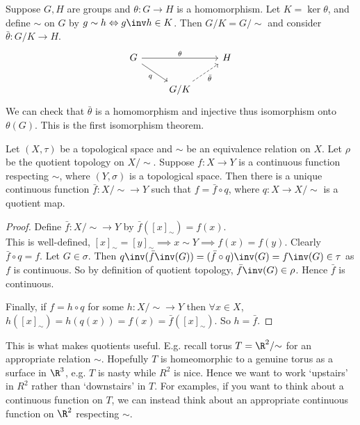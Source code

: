 \begin{example}
Suppose $G,H$ are groups and $\theta: G\to H$ is a homomorphism. Let $K = \ker\theta$, and define $\sim$ on $G$ by $g\sim h\Leftrightarrow g\inv h\in K$. Then $G/K = G/ {\sim}$ and consider $\bar{\theta}: G/K\to H$.
\[\begin{tikzcd}
	G & {} & H \\
	& {G / K}
	\arrow["q"', from=1-1, to=2-2]
	\arrow["{\bar{\theta}}"', dashed, from=2-2, to=1-3]
	\arrow["\theta", from=1-1, to=1-3]
\end{tikzcd}\]
We can check that $\bar{\theta}$ is a homomorphism and injective thus isomorphism onto $\theta(G)$. This is the first isomorphism theorem.
\end{example}

\begin{proposition} \label{prp:40}
    Let $(X,\tau)$ be a topological space and $\sim$ be an equivalence relation on $X$. Let $\rho$ be the quotient topology on $X/ {\sim}$. Suppose $f: X\to Y$ is a continuous function respecting $\sim$, where $(Y,\sigma)$ is a topological space. Then there is a unique continuous function $\bar{f}:X/ {\sim}\to Y$ such that $f = \bar{f}\circ q$, where $q: X\to X/ {\sim}$ is a quotient map.
\end{proposition}

\begin{proof}
Define $\bar{f}: X/ {\sim}\to Y$ by $\bar{f}([x]_\sim) = f(x)$. \\
This is well-defined, $[x]_\sim = [y]_\sim \implies x\sim Y \implies f(x) = f(y)$.
Clearly $\bar{f}\circ q=f$.
Let $G\in \sigma$. Then $q\inv(\bar{f}\inv(G)) = (\bar{f}\circ q)\inv (G) = f\inv (G)\in \tau$ as $f$ is continuous.
So by definition of quotient topology, $\bar{f}\inv(G)\in \rho$.
Hence $\bar{f}$ is continuous.

Finally, if $f = h \circ q$ for some $h:X/ {\sim}\to Y$ then $\forall x\in X$, $h([x]_\sim) = h(q(x)) = f(x) =\bar{f}([x]_\sim)$. So $h = \bar{f}$.
\end{proof}

\begin{remark}
This is what makes quotients useful.
E.g. recall torus $T = \R^2/ {\sim}$ for an appropriate relation $\sim$.
Hopefully $T$ is homeomorphic to a genuine torus as a surface in $\R^3$, e.g. $T$ is nasty while $R^2$ is nice.
Hence we want to work `upstairs' in $R^2$ rather than `downstairs' in $T$.
For examples, if you want to think about a continuous function on $T$, we can instead think about an appropriate continuous function on $\R^2$ respecting $\sim$.
\end{remark}

